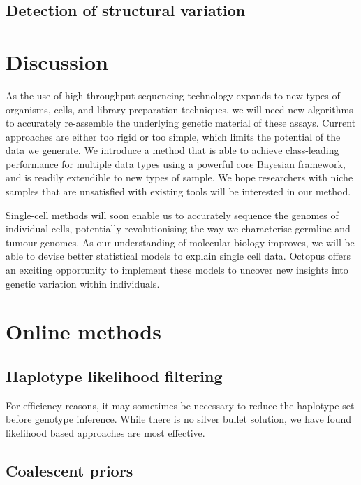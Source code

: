 \documentclass[notitlepage, twocolumn]{article}
\begin{document}
\subsection*{Detection of structural variation}

\section*{Discussion}

As the use of high-throughput sequencing technology expands to new types of organisms, cells, and library preparation techniques, we will need new algorithms to accurately re-assemble the underlying genetic material of these assays. Current approaches are either too rigid or too simple, which limits the potential of the data we generate. We introduce a method that is able to achieve class-leading performance for multiple data types using a powerful core Bayesian framework, and is readily extendible to new types of sample. We hope researchers with niche samples that are unsatisfied with existing tools will be interested in our method.

Single-cell methods will soon enable us to accurately sequence the genomes of individual cells, potentially revolutionising the way we characterise germline and tumour genomes. As our understanding of molecular biology improves, we will be able to devise better statistical models to explain single cell data. Octopus offers an exciting opportunity to implement these models to uncover new insights into genetic variation within individuals.




\section*{Online methods}

\subsection*{Haplotype likelihood filtering}

For efficiency reasons, it may sometimes be necessary to reduce the haplotype set before genotype inference. While there is no silver bullet solution, we have found likelihood based approaches are most effective.

\subsection*{Coalescent priors}
\end{document}
